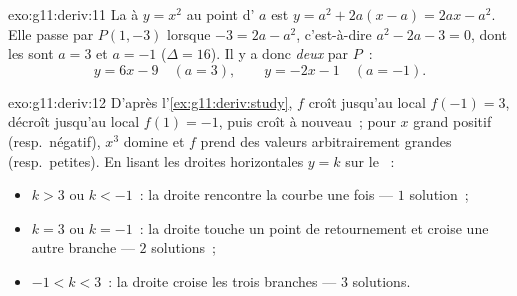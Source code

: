 \begin{solution}{exo:g11:deriv:11}
La  à $y = x^2$ au point d' $a$ est
$y = a^2 + 2a(x - a) = 2ax - a^2$. Elle passe par $P(1, -3)$ lorsque
$-3 = 2a - a^2$, c'est-à-dire $a^2 - 2a - 3 = 0$, dont les  sont
$a = 3$ et $a = -1$ ($\Delta = 16$). Il y a donc \emph{deux} 
par $P$~:
\[
y = 6x - 9 \quad (a = 3),
\qquad
y = -2x - 1 \quad (a = -1).
\]
\end{solution}

\begin{solution}{exo:g11:deriv:12}
D'après l'\cref{ex:g11:deriv:study}, $f$ croît jusqu'au  local
$f(-1) = 3$, décroît jusqu'au  local $f(1) = -1$, puis croît à
nouveau~; pour $x$ grand positif (resp.\ négatif), $x^3$ domine et $f$
prend des valeurs arbitrairement grandes (resp.\ petites). En lisant les
droites horizontales $y = k$ sur le ~:
\begin{itemize}
  \item $k > 3$ ou $k < -1$~: la droite rencontre la courbe une fois
        --- $1$ solution~;
  \item $k = 3$ ou $k = -1$~: la droite touche un point de retournement
        et croise une autre branche --- $2$ solutions~;
  \item $-1 < k < 3$~: la droite croise les trois branches --- $3$
        solutions.
\end{itemize}
\end{solution}

